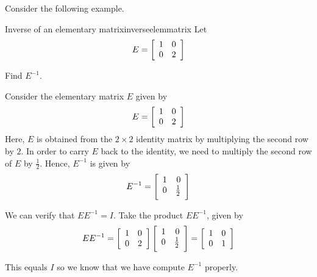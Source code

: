 Consider the following example.

\begin{example}{Inverse of an elementary matrix}{inverseelemmatrix}
Let 
\begin{equation*}
E
=
\left[
\begin{array}{rr}
1 & 0 \\
0 & 2
\end{array}
\right]
\end{equation*}

Find $E^{-1}$. 
\end{example}

\begin{solution}
Consider the elementary matrix $E$ given by 
\begin{equation*}
E
=
\left[
\begin{array}{rr}
1 & 0 \\
0 & 2
\end{array}
\right]
\end{equation*}
Here, $E$ is obtained from the $2 \times 2$ identity matrix by multiplying the second row by $2$. In order to carry $E$ back to the identity,
we need to multiply the second row of $E$ by $\frac{1}{2}$. 
Hence, $E^{-1}$ is given by
\begin{equation*}
E^{-1}
=
\leftB
\begin{array}{rr}
1 & 0 \\
0 & \vspace{0.05in}\frac{1}{2}
\end{array}
\rightB
\end{equation*}

We can verify that $EE^{-1}=I$. Take the product $EE^{-1}$, given by
\begin{equation*}
EE^{-1}
=
\leftB
\begin{array}{rr}
1 & 0 \\
0 & 2
\end{array}
\rightB
\leftB
\begin{array}{rr}
1 & 0 \\
0 & \vspace{0.05in}\frac{1}{2}
\end{array}
\rightB
=
\leftB
\begin{array}{rr}
1 & 0 \\
0 & 1
\end{array}
\rightB
\end{equation*}

This equals $I$ so we know that we have compute $E^{-1}$ properly. 
\end{solution}

